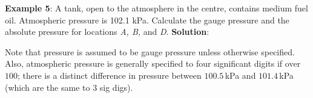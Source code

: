 \documentclass[10pt]{amsart}
\begin{document}
\newpage

\begin{minipage}[t]{0.45\textwidth}
	\raggedright
	\textbf{Example 5}:
	A tank, open to the atmosphere in the centre, contains medium fuel
	oil. Atmospheric pressure is 102.1 kPa. Calculate the gauge pressure
	and the absolute pressure for locations \emph{A, B,} and \emph{D}.
	\parb
	\textbf{Solution}:
	\pars
	
	\parb
	Note that pressure is assumed to be gauge pressure unless otherwise specified.\parb
	Also, atmospheric pressure is generally specified to four significant digits if over $100$; there is a distinct
	difference in pressure between $100.5\,$kPa and $101.4\,$kPa (which are the same to $3$ sig digs).
	
\end{minipage}
\hfill
\begin{minipage}[t]{0.45\textwidth}
	
	\parm
	
\end{minipage}
\end{document}
